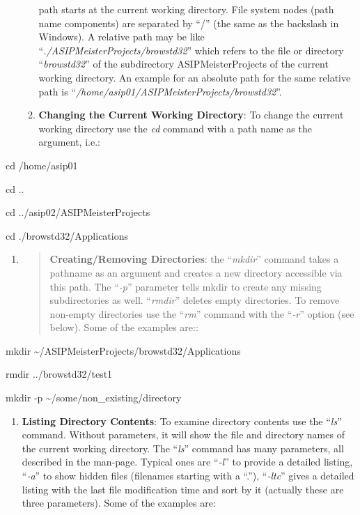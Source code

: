 \documentclass[
]{article}
\begin{document}
\begin{itemize}
\begin{enumerate}
    path starts at the current working directory. File system nodes
    (path name components) are separated by ``/'' (the same as the
    backslash in Windows). A relative path may be like
    ``\emph{./ASIPMeisterProjects/browstd32}'' which refers to the file
    or directory ``\emph{browstd32}'' of the subdirectory
    ASIPMeisterProjects of the current working directory. An example for
    an absolute path for the same relative path is
    ``\emph{/home/asip01/ASIPMeisterProjects/browstd32}''.
  \item
    \textbf{Changing the Current Working Directory}: To change the
    current working directory use the \emph{cd} command with a path name
    as the argument, i.e.:
  \end{enumerate}
\end{itemize}

cd /home/asip01

cd ..

cd ../asip02/ASIPMeisterProjects

cd ./browstd32/Applications

\begin{enumerate}
\def\labelenumi{\alph{enumi}.}
\setcounter{enumi}{5}
\item
  \begin{quote}
  \textbf{Creating/Removing Directories}: the ``\emph{mkdir}'' command
  takes a pathname as an argument and creates a new directory accessible
  via this path. The ``\emph{-p}'' parameter tells mkdir to create any
  missing subdirectories as well. ``\emph{rmdir}'' deletes empty
  directories. To remove non-empty directories use the ``\emph{rm}''
  command with the ``\emph{‑r}'' option (see below). Some of the
  examples are::
  \end{quote}
\end{enumerate}

mkdir \textasciitilde/ASIPMeisterProjects/browstd32/Applications

rmdir ../browstd32/test1

mkdir -p \textasciitilde/some/non\_existing/directory

\begin{enumerate}
\def\labelenumi{\alph{enumi}.}
\setcounter{enumi}{6}
\item
  \textbf{Listing Directory Contents}: To examine directory contents use
  the ``\emph{ls}'' command. Without parameters, it will show the file
  and directory names of the current working directory. The
  ``\emph{ls}'' command has many parameters, all described in the
  man-page. Typical ones are ``\emph{‑l}'' to provide a detailed
  listing, ``\emph{‑a}'' to show hidden files (filenames starting with a
  ``.''), ``\emph{‑ltc}'' gives a detailed listing with the last file
  modification time and sort by it (actually these are three
  parameters). Some of the examples are:
\end{enumerate}
\end{document}

